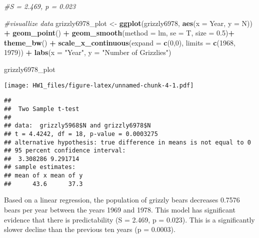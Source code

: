 \documentclass[]{article}
\newenvironment{Shaded}{\begin{snugshade}}{\end{snugshade}}
\newcommand{\KeywordTok}[1]{\textcolor[rgb]{0.13,0.29,0.53}{\textbf{#1}}}
\newcommand{\DataTypeTok}[1]{\textcolor[rgb]{0.13,0.29,0.53}{#1}}
\newcommand{\DecValTok}[1]{\textcolor[rgb]{0.00,0.00,0.81}{#1}}
\newcommand{\FloatTok}[1]{\textcolor[rgb]{0.00,0.00,0.81}{#1}}
\newcommand{\StringTok}[1]{\textcolor[rgb]{0.31,0.60,0.02}{#1}}
\newcommand{\CommentTok}[1]{\textcolor[rgb]{0.56,0.35,0.01}{\textit{#1}}}
\newcommand{\OperatorTok}[1]{\textcolor[rgb]{0.81,0.36,0.00}{\textbf{#1}}}
\newcommand{\NormalTok}[1]{#1}
\begin{document}
\begin{Shaded}
\begin{Highlighting}[]
\CommentTok{#S = 2.469, p = 0.023}

\CommentTok{#visuallize data}
\NormalTok{grizzly6978_plot <-}\StringTok{ }\KeywordTok{ggplot}\NormalTok{(grizzly6978, }\KeywordTok{aes}\NormalTok{(}\DataTypeTok{x =}\NormalTok{ Year, }\DataTypeTok{y =}\NormalTok{ N)) }\OperatorTok{+}
\StringTok{  }\KeywordTok{geom_point}\NormalTok{() }\OperatorTok{+}
\StringTok{  }\KeywordTok{geom_smooth}\NormalTok{(}\DataTypeTok{method =}\NormalTok{ lm, }\DataTypeTok{se =}\NormalTok{ T, }\DataTypeTok{size =} \FloatTok{0.5}\NormalTok{)}\OperatorTok{+}
\StringTok{  }\KeywordTok{theme_bw}\NormalTok{() }\OperatorTok{+}
\StringTok{  }\KeywordTok{scale_x_continuous}\NormalTok{(}\DataTypeTok{expand =} \KeywordTok{c}\NormalTok{(}\DecValTok{0}\NormalTok{,}\DecValTok{0}\NormalTok{), }\DataTypeTok{limits =} \KeywordTok{c}\NormalTok{(}\DecValTok{1968}\NormalTok{, }\DecValTok{1979}\NormalTok{)) }\OperatorTok{+}
\StringTok{  }\KeywordTok{labs}\NormalTok{(}\DataTypeTok{x =} \StringTok{"Year"}\NormalTok{, }\DataTypeTok{y =} \StringTok{"Number of Grizzlies"}\NormalTok{)}


\NormalTok{grizzly6978_plot}
\end{Highlighting}
\end{Shaded}

\texttt{[image: HW1\_files/figure-latex/unnamed-chunk-4-1.pdf]}

\begin{Shaded}
\end{Shaded}

\begin{verbatim}
## 
##  Two Sample t-test
## 
## data:  grizzly5968$N and grizzly6978$N
## t = 4.4242, df = 18, p-value = 0.0003275
## alternative hypothesis: true difference in means is not equal to 0
## 95 percent confidence interval:
##  3.308286 9.291714
## sample estimates:
## mean of x mean of y 
##      43.6      37.3
\end{verbatim}

Based on a linear regression, the population of grizzly bears decreases
0.7576 bears per year between the years 1969 and 1978. This model has
significant evidence that there is predictability (S = 2.469, p =
0.023). This is a significantly slower decline than the previous ten
years (p = 0.0003).
\end{document}
